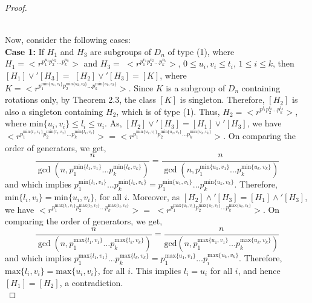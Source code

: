 \documentclass{article}
\theoremstyle{definition}
\begin{document}
\begin{proof}
\begin{figure}[h!]
\begin{tikzpicture}[scale=1.5,  every node/.style={circle, fill=black, minimum size=6pt, inner sep=0pt}]
		\end{tikzpicture}
        \caption{}
\end{figure}\\
Now, consider the following cases:\vspace{0.2cm} \\
\textbf{Case 1:} If $H_1$ and $H_3$ are subgroups of $D_n$ of type (1), where $H_1=\bigl<r^{p_1^{u_1}p_2^{u_2}\dots p_k^{u_k}}\bigr>$ and $H_3=$ $\bigl<r^{p_1^{v_1}p_2^{v_2}\dots p_k^{v_k}}\bigr>$, $0\le u_i,v_i\le t_i$, $1\le i\le k$, then $[H_1]\vee' [H_3]=$    $[H_2]\vee' [H_3]=[K]$, where $K=\bigl<r^{p_1^{\text{min}\{u_1,v_1\}}p_2^{\text{min}\{u_2,v_2\}}\dots p_k^{\text{min}\{u_k,v_k\}}}\bigr> $. Since $K$ is a subgroup of $D_n$ containing rotations only, by Theorem 2.3, the class $[K]$ is singleton. Therefore, $[H_2]$ is also a singleton containing $H_2$, which is of type (1). Thus, $H_2=\bigl<r^{p^{l_1}p_2^{l_2}\dots p_k^{l_k}}\bigr>$, where $\text{min}\{u_i,v_i\}\le l_i\le u_i$. As, $[H_2]\vee' [H_3]=[H_1]\vee' [H_3]$, we have $\bigl<r^{p_1^{\text{min}\{l_1,v_1\}}p_2^{\text{min}\{l_2,v_2\}}\dots p_k^{\text{min}\{l_k,v_k\}}}\bigr>=   \bigl<r^{p_1^{\text{min}\{u_1,v_1\}}p_2^{\text{min}\{u_2,v_2\}}\dots p_k^{\text{min}\{u_k,v_k\}}}\bigr> $. On comparing the order of generators, we get,
\begin{equation*}
\frac{n}{\gcd(n, p_1^{\text{min}\{l_1,v_1\}}\dots p_k^{\text{min}\{l_k,v_k\}}   )}=\frac{n}{\gcd(n, p_1^{\text{min}\{u_1,v_1\}}\dots p_k^{\text{min}\{u_k,v_k\}})}
\end{equation*}
and which implies $p_1^{\text{min}\{l_1,v_1\}}\dots p_k^{\text{min}\{l_k,v_k\}}=p_1^{\text{min}\{u_1,v_1\}}\dots p_k^{\text{min}\{u_k,v_k\}}$. Therefore, $\text{min}\{l_i,v_i\}=\text{min}\{u_i,v_i\}$, for all $i$.
Moreover, as $[H_2]\wedge' [H_3]=[H_1]\wedge'[H_3]$, we have $\bigl<r^{p_1^{\text{max}\{l_1,v_1\}}p_2^{\text{max}\{l_2,v_2\}}\dots p_k^{\text{max}\{l_k,v_k\}}}\bigr>=  $ $ \bigl<r^{p_1^{\text{max}\{u_1,v_1\}}p_2^{\text{max}\{u_2,v_2\}}\dots p_k^{\text{max}\{u_k,v_k\}}}\bigr>$. On comparing the order of generators, we get,
\begin{equation*}
\frac{n}{\gcd(n, p_1^{\text{max}\{l_1,v_1\}}\dots p_k^{\text{max}\{l_k,v_k\}}   )}=\frac{n}{\text{gcd}(n, p_1^{\text{max}\{u_1,v_1\}}\dots p_k^{\text{max}\{u_k,v_k\}})}
\end{equation*}
and which implies $p_1^{\text{max}\{l_1,v_1\}}\dots p_k^{\text{max}\{l_k,v_k\}}=p_1^{\text{max}\{u_1,v_1\}}\dots p_i^{\text{max}\{u_k,v_k\}}$. Therefore, $\text{max}\{l_i,v_i\}=\text{max}\{u_i,v_i\}$, for all $i$. This implies $l_i=u_i$ for all $i$, and hence $[H_1]=[H_2]$, a contradiction. \vspace{0.2cm} \\

\end{proof}
\end{document}
